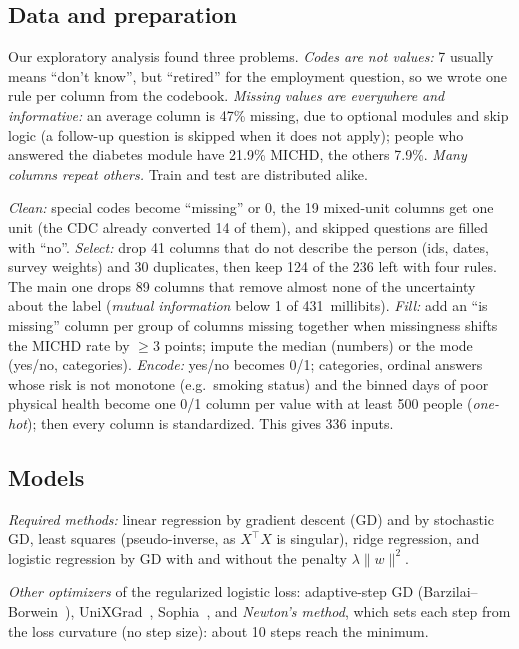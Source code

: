 \documentclass[10pt,conference,compsocconf]{IEEEtran}
\begin{document}
\subsection{Data and preparation}
\label{sec:data}

Our exploratory analysis found three problems.
\emph{Codes are not values:} 7 usually means ``don't know'', but ``retired'' for the
employment question, so we wrote one rule per column from the codebook.
\emph{Missing values are everywhere and informative:} an average column is 47\% missing, due to optional modules and skip logic (a follow-up question is
skipped when it does not apply); people who answered the diabetes module have 21.9\%
MICHD, the others 7.9\%. \emph{Many columns repeat others.} Train and test are
distributed alike.

\emph{Clean:} special codes become ``missing'' or 0, the 19 mixed-unit columns get one
unit (the CDC already converted 14 of them), and skipped questions are filled with ``no''.
\emph{Select:} drop 41 columns that do not describe the person (ids, dates, survey
weights) and 30 duplicates, then keep 124 of the 236 left with four rules. The main
one drops 89 columns that remove almost none of the uncertainty about the label
(\emph{mutual information} below 1 of 431~millibits).
\emph{Fill:} add an ``is missing'' column per group of columns missing together
when missingness shifts the MICHD rate by $\geq$3 points; impute the median (numbers)
or the mode (yes/no, categories).
\emph{Encode:} yes/no becomes 0/1; categories, ordinal answers whose risk is not
monotone (e.g.\ smoking status) and the binned days of poor physical health become one
0/1 column per value with at least 500 people (\emph{one-hot}); then every column is
standardized. This gives 336 inputs.

\subsection{Models}
\label{sec:models}

\emph{Required methods:} linear regression by gradient descent (GD) and by
stochastic GD, least squares (pseudo-inverse, as $X^\top X$ is singular), ridge
regression, and logistic regression by GD with and without the penalty
$\lambda\|w\|^2$.

\emph{Other optimizers} of the regularized logistic loss: adaptive-step GD
(Barzilai--Borwein~\cite{barzilai1988}), UniXGrad~\cite{kavis2019unixgrad},
Sophia~\cite{liu2023sophia}, and \emph{Newton's method}, which sets each step from the
loss curvature (no step size): about 10 steps reach the minimum.
\end{document}
